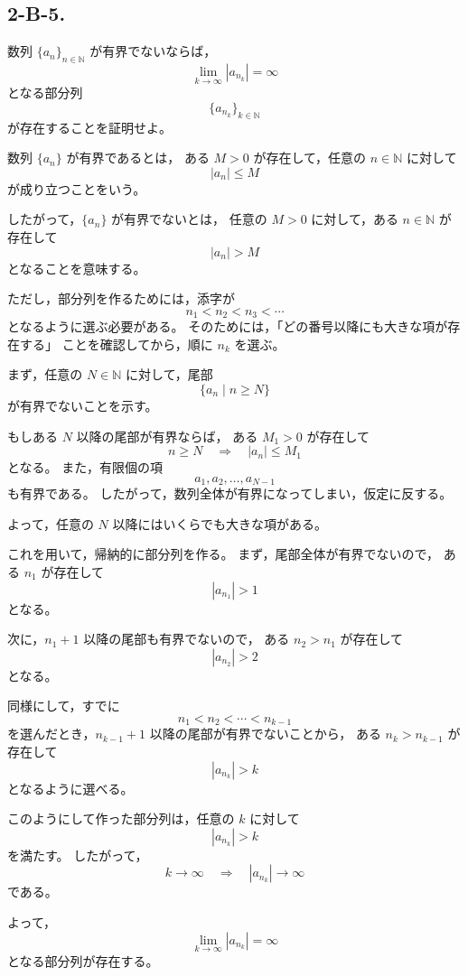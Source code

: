 \subsection{2-B-5.}
\begin{exercise}
	数列 \(\{a_n\}_{n\in\mathbb{N}}\) が有界でないならば，
	\[
	\lim_{k\to\infty}|a_{n_k}|=\infty
	\]
	となる部分列
	\[
	\{a_{n_k}\}_{k\in\mathbb{N}}
	\]
	が存在することを証明せよ。
\end{exercise}

\begin{background}
	数列 \(\{a_n\}\) が有界であるとは，
	ある \(M>0\) が存在して，任意の \(n\in\mathbb{N}\) に対して
	\[
	|a_n|\leq M
	\]
	が成り立つことをいう。
	
	したがって，\(\{a_n\}\) が有界でないとは，
	任意の \(M>0\) に対して，ある \(n\in\mathbb{N}\) が存在して
	\[
	|a_n|>M
	\]
	となることを意味する。
	
	ただし，部分列を作るためには，添字が
	\[
	n_1<n_2<n_3<\cdots
	\]
	となるように選ぶ必要がある。
	そのためには，「どの番号以降にも大きな項が存在する」
	ことを確認してから，順に \(n_k\) を選ぶ。
\end{background}

\begin{strategy}
	まず，任意の \(N\in\mathbb{N}\) に対して，尾部
	\[
	\{a_n\mid n\geq N\}
	\]
	が有界でないことを示す。
	
	もしある \(N\) 以降の尾部が有界ならば，
	ある \(M_1>0\) が存在して
	\[
	n\geq N
	\quad\Longrightarrow\quad
	|a_n|\leq M_1
	\]
	となる。
	また，有限個の項
	\[
	a_1,a_2,\ldots,a_{N-1}
	\]
	も有界である。
	したがって，数列全体が有界になってしまい，仮定に反する。
	
	よって，任意の \(N\) 以降にはいくらでも大きな項がある。
	
	これを用いて，帰納的に部分列を作る。
	まず，尾部全体が有界でないので，
	ある \(n_1\) が存在して
	\[
	|a_{n_1}|>1
	\]
	となる。
	
	次に，\(n_1+1\) 以降の尾部も有界でないので，
	ある \(n_2>n_1\) が存在して
	\[
	|a_{n_2}|>2
	\]
	となる。
	
	同様にして，すでに
	\[
	n_1<n_2<\cdots<n_{k-1}
	\]
	を選んだとき，\(n_{k-1}+1\) 以降の尾部が有界でないことから，
	ある \(n_k>n_{k-1}\) が存在して
	\[
	|a_{n_k}|>k
	\]
	となるように選べる。
	
	このようにして作った部分列は，任意の \(k\) に対して
	\[
	|a_{n_k}|>k
	\]
	を満たす。
	したがって，
	\[
	k\to\infty
	\quad\Longrightarrow\quad
	|a_{n_k}|\to\infty
	\]
	である。
	
	よって，
	\[
	\lim_{k\to\infty}|a_{n_k}|=\infty
	\]
	となる部分列が存在する。
\end{strategy}